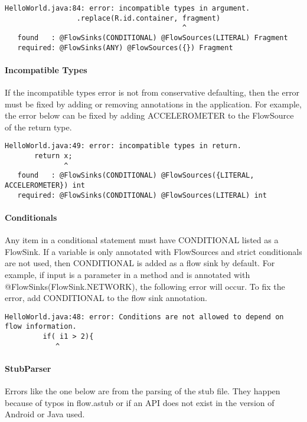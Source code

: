 \begin{Verbatim}
HelloWorld.java:84: error: incompatible types in argument.
                 .replace(R.id.container, fragment)
                                          ^
   found   : @FlowSinks(CONDITIONAL) @FlowSources(LITERAL) Fragment
   required: @FlowSinks(ANY) @FlowSources({}) Fragment
\end{Verbatim}

\paragraph{Incompatible Types}

If the incompatible types error is not from conservative defaulting, then the error must be fixed by adding or
removing annotations in the application.  For example, the error below can be fixed by adding ACCELEROMETER to the FlowSource of the return type.  

\begin{Verbatim}
HelloWorld.java:49: error: incompatible types in return.
       return x;
              ^
   found   : @FlowSinks(CONDITIONAL) @FlowSources({LITERAL, ACCELEROMETER}) int
   required: @FlowSinks(CONDITIONAL) @FlowSources(LITERAL) int
\end{Verbatim}

\paragraph{Conditionals}
Any item in a conditional statement must have CONDITIONAL listed as a FlowSink.  If a variable is only annotated with FlowSources and strict conditionals are not used, then CONDITIONAL is added as a flow sink by default.  For example, if input is a parameter in a method and is annotated with @FlowSinks(FlowSink.NETWORK), the following error will occur.  To fix the error, add CONDITIONAL to the flow sink annotation.  

\begin{Verbatim}
HelloWorld.java:48: error: Conditions are not allowed to depend on flow information.
         if( i1 > 2){
            ^
\end{Verbatim}

\paragraph{StubParser}

Errors like the one below are from the parsing of the stub file.  They happen because of typos in flow.astub or  
if an API does not exist in the version of Android or Java used.

